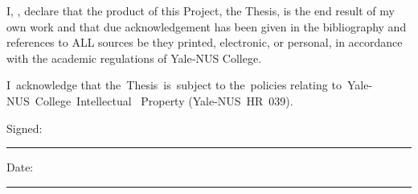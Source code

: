 \documentclass[
12pt, %
oneside, %
english, %
doublespacing, %
headsepline, %
]{MastersDoctoralThesis} %
\begin{document}

\begin{declaration}
\addchaptertocentry{\authorshipname} %

\noindent I, \authorname, declare that the product of this Project, the Thesis, is the end result of my own work and that due acknowledgement has been given in the bibliography and references to ALL sources be they  printed, electronic, or personal, in accordance with the academic regulations of Yale‐NUS College.

I acknowledge that the Thesis is subject to the policies relating to Yale‐NUS College Intellectual  Property (Yale‐NUS HR 039).


%

\noindent Signed:\\
\rule[0.5em]{25em}{0.5pt} %

\noindent Date:\\
\rule[0.5em]{25em}{0.5pt} %
\end{declaration}

\cleardoublepage
\end{document}
